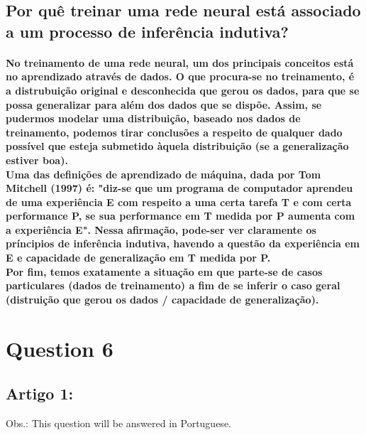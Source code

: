 \documentclass[a4paper]{article}    %
\begin{document}
\subsection*{Por quê treinar uma rede neural está associado a um processo de inferência indutiva?}

\paragraph{No treinamento de uma rede neural, um dos principais conceitos está no aprendizado através de dados. O que procura-se no treinamento, é a distrubuição original e desconhecida que gerou os dados, para que se possa generalizar para além dos dados que se dispõe. Assim, se pudermos modelar uma distribuição, baseado nos dados de treinamento, podemos tirar conclusões a respeito de qualquer dado possível que esteja submetido àquela distribuição (se a generalização estiver boa).\\
Uma das definições de aprendizado de máquina, dada por Tom Mitchell (1997) é: "diz-se que um programa de computador aprendeu de uma experiência E com respeito a uma certa tarefa T e com certa performance P, se sua performance em T medida por P aumenta com a experiência E". Nessa afirmação, pode-ser ver claramente os príncipios de inferência indutiva, havendo a questão da experiência em E e capacidade de generalização em T medida por P.\\
Por fim, temos exatamente a situação em que parte-se de casos particulares (dados de treinamento) a fim de se inferir o caso geral (distruição que gerou os dados / capacidade de generalização).}

\newpage

\section*{Question 6}

\subsection*{Artigo 1:}

Obs.: This question will be answered in Portuguese.
\end{document}
